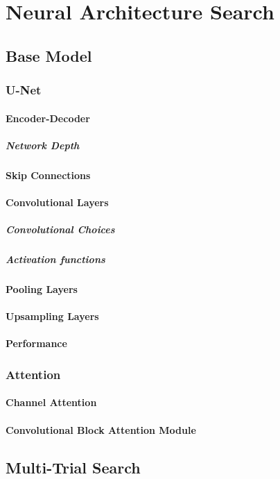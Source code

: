 \section{Neural Architecture Search}

\subsection{Base Model}
\subsubsection{U-Net}
\paragraph{Encoder-Decoder}
\subparagraph{Network Depth}
\paragraph{Skip Connections}
\paragraph{Convolutional Layers}
\subparagraph{Convolutional Choices}
\subparagraph{Activation functions}
\paragraph{Pooling Layers}
\paragraph{Upsampling Layers}
\paragraph{Performance}

\subsubsection{Attention}
\paragraph{Channel Attention}
\paragraph{Convolutional Block Attention Module}


\subsection{Multi-Trial Search}
